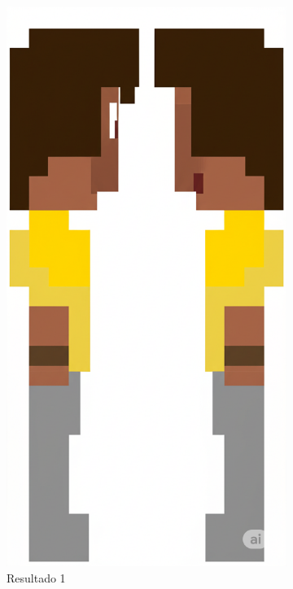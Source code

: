 \begin{figure}[htbp]
\begin{subfigure}{0.22\linewidth}
        \includegraphics[width=1\linewidth]{figs/geminiPro/chat1/res1_tela1.png}
        \caption{\small Resultado 1}
        \label{fig:geminiPro1a}
    \end{subfigure}
    \begin{subfigure}{0.22\linewidth}

\end{subfigure}
\end{figure}

